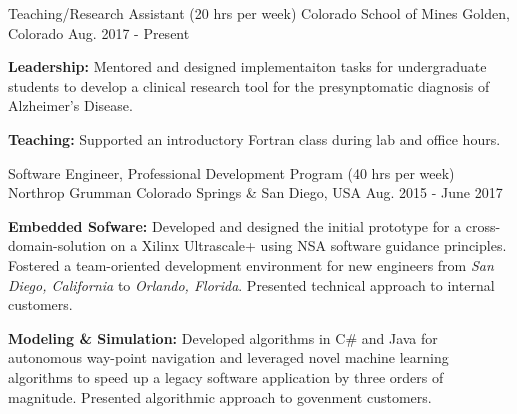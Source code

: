 

\begin{cventries}

  \cventry
    {Teaching/Research Assistant (20 hrs per week)} %
    {Colorado School of Mines} %
    {Golden, Colorado} %
    {Aug. 2017 - Present} %
    {
      \begin{cvitems} %
        \item {\textbf{Leadership:} Mentored and designed implementaiton tasks for undergraduate students to develop a clinical research tool for the presynptomatic diagnosis of Alzheimer's Disease.}
        \item {\textbf{Teaching:} Supported an introductory Fortran class during lab and office hours.}
      \end{cvitems}
    }
  \cventry
    {Software Engineer, Professional Development Program (40 hrs per week)}
    {Northrop Grumman}
    {Colorado Springs \& San Diego, USA}
    {Aug. 2015 - June 2017}
    {
      \begin{cvitems}
      \item \textbf{Embedded Sofware:} Developed and designed the initial prototype for a cross-domain-solution on a Xilinx Ultrascale+ using NSA software guidance principles. Fostered a team-oriented development environment for new engineers from \textit{San Diego, California} to \textit{Orlando, Florida}. Presented technical approach to internal customers. 
        \item \textbf{Modeling \& Simulation:} Developed algorithms in C\# and Java for autonomous way-point navigation and leveraged novel machine learning algorithms to speed up a legacy software application by three orders of magnitude. Presented algorithmic approach to govenment customers.
      \end{cvitems}
    }

\end{cventries}
